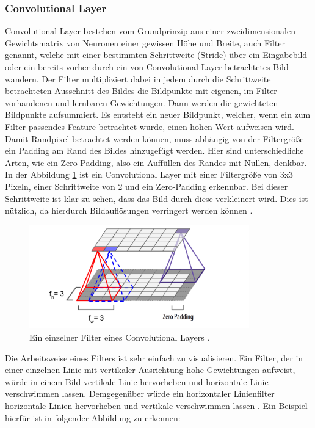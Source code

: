 \documentclass[11pt,bibliography=totocnumbered]{scrartcl}
\begin{document}
\subsubsection{Convolutional Layer}
Convolutional Layer bestehen vom Grundprinzip aus einer zweidimensionalen Gewichtsmatrix von Neuronen einer gewissen Höhe und Breite, auch Filter genannt, welche mit einer bestimmten Schrittweite (Stride) über ein Eingabebild- oder ein bereits vorher durch ein von Convolutional Layer betrachtetes Bild wandern. Der Filter multipliziert dabei in jedem durch die Schrittweite betrachteten Ausschnitt des Bildes die Bildpunkte mit eigenen, im Filter vorhandenen und lernbaren Gewichtungen. Dann werden die gewichteten Bildpunkte aufsummiert. Es entsteht ein neuer Bildpunkt, welcher, wenn ein zum Filter passendes Feature betrachtet wurde, einen hohen Wert aufweisen wird. Damit Randpixel betrachtet werden können, muss abhängig von der Filtergröße ein Padding am Rand des Bildes hinzugefügt werden. Hier sind unterschiedliche Arten, wie ein Zero-Padding, also ein Auffüllen des Randes mit Nullen, denkbar. In der Abbildung \ref{fig:cnn_filter} ist ein Convolutional Layer mit einer Filtergröße von 3x3 Pixeln, einer Schrittweite von 2 und ein Zero-Padding erkennbar. Bei dieser Schrittweite ist klar zu sehen, dass das Bild durch diese verkleinert wird. Dies ist nützlich, da hierdurch Bildauflösungen verringert werden können \cite[S.361-363]{MACHINE_LEARNING}.
\begin{figure}[H]
	\centering
	\includegraphics[width=0.85\textwidth]{cnn}
	\vspace*{-3mm}
	\caption[Einzelner Filter eines Convolutional Layers]{Ein einzelner Filter eines Convolutional Layers \cite[S.362]{MACHINE_LEARNING}.}
	\label{fig:cnn_filter}
\end{figure}
\vspace*{-5mm}
Die Arbeitsweise eines Filters ist sehr einfach zu visualisieren. Ein Filter, der in einer einzelnen Linie mit vertikaler Ausrichtung hohe Gewichtungen aufweist, würde in einem Bild vertikale Linie hervorheben und horizontale Linie verschwimmen lassen. Demgegenüber würde ein horizontaler Linienfilter horizontale Linien hervorheben und vertikale verschwimmen lassen \cite[S.363-364]{MACHINE_LEARNING}. Ein Beispiel hierfür ist in folgender Abbildung zu erkennen:
\end{document}
